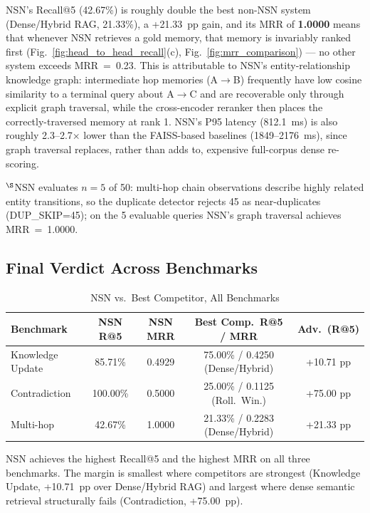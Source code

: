 \documentclass[conference]{IEEEtran}
\begin{document}
NSN's Recall@5 (42.67\%) is roughly double the best non-NSN system (Dense/Hybrid RAG, 21.33\%), a +21.33~pp gain, and its MRR of \textbf{1.0000} means that whenever NSN retrieves a gold memory, that memory is invariably ranked first (Fig.~\ref{fig:head_to_head_recall}(c), Fig.~\ref{fig:mrr_comparison}) --- no other system exceeds MRR~=~0.23. This is attributable to NSN's entity-relationship knowledge graph: intermediate hop memories (A$\rightarrow$B) frequently have low cosine similarity to a terminal query about A$\rightarrow$C and are recoverable only through explicit graph traversal, while the cross-encoder reranker then places the correctly-traversed memory at rank 1. NSN's P95 latency (812.1~ms) is also roughly 2.3--2.7$\times$ lower than the FAISS-based baselines (1849--2176~ms), since graph traversal replaces, rather than adds to, expensive full-corpus dense re-scoring.

$^{\S}$NSN evaluates $n=5$ of 50: multi-hop chain observations describe highly related entity transitions, so the duplicate detector rejects 45 as near-duplicates (DUP\_SKIP=45); on the 5 evaluable queries NSN's graph traversal achieves MRR~=~1.0000.

\subsection{Final Verdict Across Benchmarks}

\begin{table}[t]
\caption{NSN vs.\ Best Competitor, All Benchmarks}
\label{tab:verdict}
\centering
\scriptsize
\begin{tabular}{@{}lcccc@{}}
\toprule
\textbf{Benchmark} & \textbf{NSN R@5} & \textbf{NSN MRR} & \textbf{Best Comp.\ R@5 / MRR} & \textbf{Adv.\ (R@5)} \\
\midrule
Knowledge Update & 85.71\% & 0.4929 & 75.00\% / 0.4250 (Dense/Hybrid) & +10.71 pp \\
Contradiction & 100.00\% & 0.5000 & 25.00\% / 0.1125 (Roll.\ Win.) & +75.00 pp \\
Multi-hop & 42.67\% & 1.0000 & 21.33\% / 0.2283 (Dense/Hybrid) & +21.33 pp \\
\bottomrule
\end{tabular}
\end{table}

NSN achieves the highest Recall@5 and the highest MRR on all three benchmarks. The margin is smallest where competitors are strongest (Knowledge Update, +10.71~pp over Dense/Hybrid RAG) and largest where dense semantic retrieval structurally fails (Contradiction, +75.00~pp).
\end{document}
